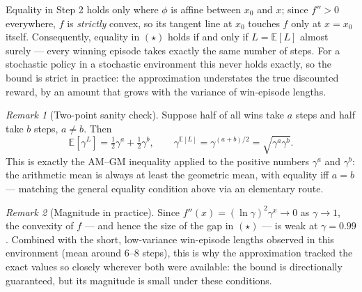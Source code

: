 \documentclass[11pt]{article}
\theoremstyle{remark}
\newtheorem*{remark}{Remark}
\begin{document}
Equality in Step 2 holds only where $\phi$ is affine between $x_0$ and $x$; since
$f'' > 0$ everywhere, $f$ is \emph{strictly} convex, so its tangent line at $x_0$
touches $f$ only at $x = x_0$ itself. Consequently, equality in $(\star)$ holds if
and only if $L = \mathbb{E}[L]$ almost surely --- every winning episode takes exactly
the same number of steps. For a stochastic policy in a stochastic environment this
never holds exactly, so the bound is strict in practice: the approximation
understates the true discounted reward, by an amount that grows with the variance
of win-episode lengths.

\begin{remark}[Two-point sanity check]
Suppose half of all wins take $a$ steps and half take $b$ steps, $a \neq b$. Then
\[
  \mathbb{E}[\gamma^{L}] = \tfrac12\gamma^{a} + \tfrac12\gamma^{b},
  \qquad
  \gamma^{\mathbb{E}[L]} = \gamma^{(a+b)/2} = \sqrt{\gamma^{a}\gamma^{b}}.
\]
This is exactly the AM--GM inequality applied to the positive numbers $\gamma^a$ and
$\gamma^b$: the arithmetic mean is always at least the geometric mean, with equality
iff $a = b$ --- matching the general equality condition above via an elementary
route.
\end{remark}

\begin{remark}[Magnitude in practice]
Since $f''(x) = (\ln\gamma)^2\gamma^x \to 0$ as $\gamma \to 1$, the convexity of
$f$ --- and hence the size of the gap in $(\star)$ --- is weak at $\gamma = 0.99$.
Combined with the short, low-variance win-episode lengths observed in this
environment (mean around 6--8 steps), this is why the approximation tracked the
exact values so closely wherever both were available: the bound is directionally
guaranteed, but its magnitude is small under these conditions.
\end{remark}
\end{document}
